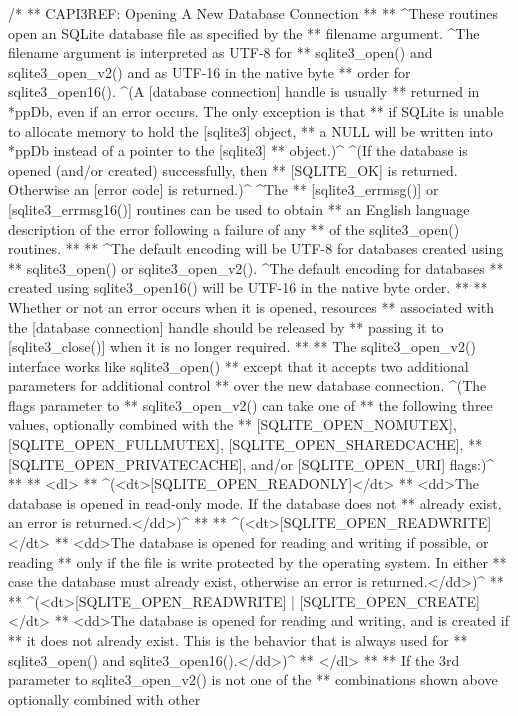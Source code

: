 \begin{Codex}[label=sqlite3.h,numbers=left]
{/*
** CAPI3REF: Opening A New Database Connection
**
** ^These routines open an SQLite database file as specified by the 
** filename argument. ^The filename argument is interpreted as UTF-8 for
** sqlite3_open() and sqlite3_open_v2() and as UTF-16 in the native byte
** order for sqlite3_open16(). ^(A [database connection] handle is usually
** returned in *ppDb, even if an error occurs.  The only exception is that
** if SQLite is unable to allocate memory to hold the [sqlite3] object,
** a NULL will be written into *ppDb instead of a pointer to the [sqlite3]
** object.)^ ^(If the database is opened (and/or created) successfully, then
** [SQLITE_OK] is returned.  Otherwise an [error code] is returned.)^ ^The
** [sqlite3_errmsg()] or [sqlite3_errmsg16()] routines can be used to obtain
** an English language description of the error following a failure of any
** of the sqlite3_open() routines.
**
** ^The default encoding will be UTF-8 for databases created using
** sqlite3_open() or sqlite3_open_v2().  ^The default encoding for databases
** created using sqlite3_open16() will be UTF-16 in the native byte order.
**
** Whether or not an error occurs when it is opened, resources
** associated with the [database connection] handle should be released by
** passing it to [sqlite3_close()] when it is no longer required.
**
** The sqlite3_open_v2() interface works like sqlite3_open()
** except that it accepts two additional parameters for additional control
** over the new database connection.  ^(The flags parameter to
** sqlite3_open_v2() can take one of
** the following three values, optionally combined with the 
** [SQLITE_OPEN_NOMUTEX], [SQLITE_OPEN_FULLMUTEX], [SQLITE_OPEN_SHAREDCACHE],
** [SQLITE_OPEN_PRIVATECACHE], and/or [SQLITE_OPEN_URI] flags:)^
**
** <dl>
** ^(<dt>[SQLITE_OPEN_READONLY]</dt>
** <dd>The database is opened in read-only mode.  If the database does not
** already exist, an error is returned.</dd>)^
**
** ^(<dt>[SQLITE_OPEN_READWRITE]</dt>
** <dd>The database is opened for reading and writing if possible, or reading
** only if the file is write protected by the operating system.  In either
** case the database must already exist, otherwise an error is returned.</dd>)^
**
** ^(<dt>[SQLITE_OPEN_READWRITE] | [SQLITE_OPEN_CREATE]</dt>
** <dd>The database is opened for reading and writing, and is created if
** it does not already exist. This is the behavior that is always used for
** sqlite3_open() and sqlite3_open16().</dd>)^
** </dl>
**
** If the 3rd parameter to sqlite3_open_v2() is not one of the
** combinations shown above optionally combined with other
}
\end{Codex}
